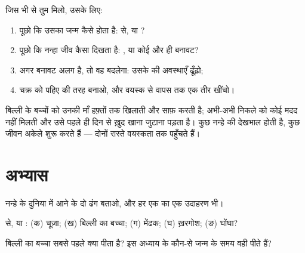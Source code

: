 \begin{method}[किसी जंतु का जीवन चक्र पढ़ना]\label{met:g2:animals-grow-up:read}
जिस भी  से तुम मिलो, उसके लिए:
\begin{enumerate}
  \item पूछो कि उसका जन्म कैसे होता है:  से, या ?
  \item पूछो कि नन्हा जीव कैसा दिखता है: ,
        या कोई और ही बनावट?
  \item अगर बनावट अलग है, तो वह बदलेगा: उसके  की अवस्थाएँ
        ढूँढ़ो;
  \item चक्र को पहिए की तरह बनाओ, और वयस्क से वापस  तक एक तीर
        खींचो।
\end{enumerate}
\end{method}

\begin{remark}[दूध, या सीधे काम पर]\label{rem:g2:animals-grow-up:care}
बिल्ली के बच्चों को उनकी माँ हफ़्तों तक खिलाती और साफ़ करती है; अभी-अभी
निकले  को कोई मदद नहीं मिलती और उसे पहले ही दिन से ख़ुद खाना
जुटाना पड़ता है। कुछ नन्हे  की देखभाल होती है, कुछ जीवन अकेले
शुरू करते हैं --- दोनों रास्ते वयस्कता तक पहुँचते हैं।
\end{remark}

\section{अभ्यास}

\begin{exercise}[$\star$]\label{exo:g2:animals-grow-up:1}
नन्हे  के दुनिया में आने के दो ढंग बताओ, और हर एक का एक उदाहरण
भी।
\end{exercise}

\begin{exercise}[$\star$]\label{exo:g2:animals-grow-up:2}
 से, या : (क) चूज़ा; (ख) बिल्ली का बच्चा; (ग) मेंढक;
(घ) ख़रगोश; (ङ) घोंघा?
\end{exercise}

\begin{exercise}[$\star$]\label{exo:g2:animals-grow-up:3}
बिल्ली का बच्चा सबसे पहले क्या पीता है? इस अध्याय के कौन-से 
जन्म के समय वही पीते हैं?
\end{exercise}

